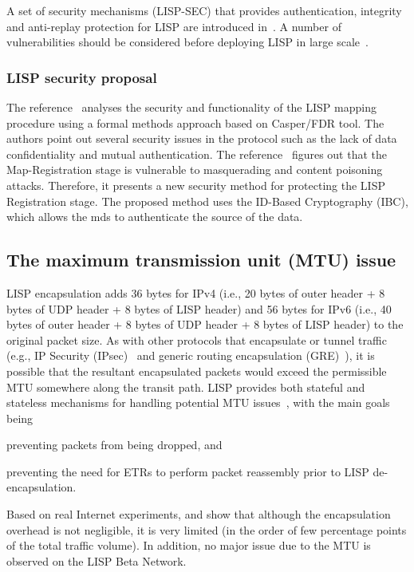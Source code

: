 A set of security mechanisms (LISP-SEC) that provides authentication, integrity and anti-replay protection for LISP are introduced in~\cite{maino2017lisp}. A number of vulnerabilities should be considered before deploying LISP in large scale~\cite{raheem2013supporting}.

\subsubsection{LISP security proposal}
\label{subsubsec:security_proposal}
The reference~\cite{aiash2013novel} analyses the security and functionality of the LISP mapping procedure using a formal methods approach based on Casper/FDR tool. The authors point out several security issues in the protocol such as the lack of data confidentiality and mutual authentication. The reference~\cite{aiash2013securing} figures out that the Map-Registration stage is vulnerable to masquerading and content poisoning attacks. Therefore, it presents a new security method for protecting the LISP Registration stage. The proposed method uses the ID-Based Cryptography (IBC), which allows the \acrshort{mds} to authenticate the source of the data. 

\subsection{The maximum transmission unit (MTU) issue}
\label{subsubsec:mtu}
LISP encapsulation adds 36 bytes for IPv4 (i.e., 20 bytes of outer header + 8 bytes of UDP header + 8 bytes of LISP header) and 56 bytes for IPv6 (i.e., 40 bytes of outer header + 8 bytes of UDP header + 8 bytes of LISP header) to the original packet size. As with other protocols that encapsulate or tunnel traffic (e.g., IP Security (IPsec)~\cite{thayer1998rfc} and generic routing encapsulation (GRE)~\cite{farinacci2000generic}), it is possible that the resultant encapsulated packets would exceed the permissible MTU somewhere along the transit path. LISP provides both stateful and stateless mechanisms for handling potential MTU issues~\cite{CiscoLISPQA}, with the main goals being 
\begin{enumerate*}[label=(\roman*)]
	\item preventing packets from being dropped, and
	\item preventing the need for ETRs to perform packet reassembly prior to LISP de-encapsulation. 
\end{enumerate*}

Based on real Internet experiments, \cite{lispCacheCost} and \cite{kim2013caching} show that although the encapsulation overhead is not negligible, it is very limited (in the order of few percentage points of the total traffic volume). In addition, no major issue due to the MTU is observed on the LISP Beta Network.


